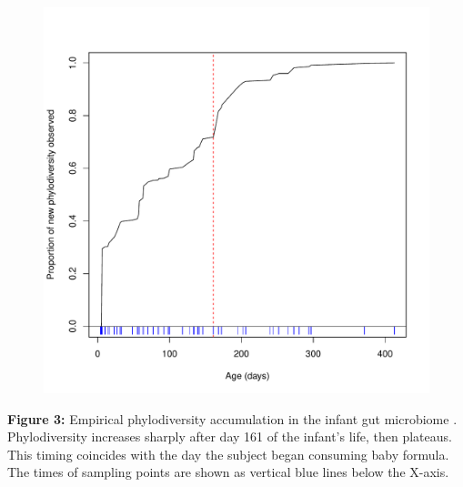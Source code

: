 \documentclass{article}
\begin{document}
{\begin{figure}[t]
	\centering
	\includegraphics[scale=0.80]{figs/Fig_3.pdf}
\end{figure}
\textbf{Figure 3:}\label{sec:figure3} Empirical phylodiversity accumulation in the infant gut microbiome \cite{Koenig2011}. Phylodiversity increases sharply after day 161 of the infant’s life, then plateaus. This timing coincides with the day the subject began consuming baby formula. The times of sampling points are shown as vertical blue lines below the X-axis.
\newpage

}
\end{document}
